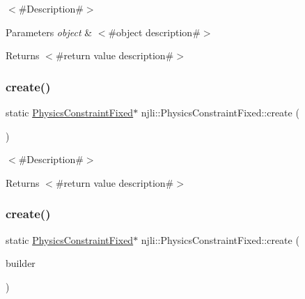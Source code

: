 $<$\#\+Description\#$>$


\begin{DoxyParams}{Parameters}
{\em object} & $<$\#object description\#$>$\\
\hline
\end{DoxyParams}
\begin{DoxyReturn}{Returns}
$<$\#return value description\#$>$ 
\end{DoxyReturn}
\mbox{\label{classnjli_1_1_physics_constraint_fixed_a871ec2fb30520315e5b94f903919bf6c}} 
\subsubsection{\texorpdfstring{create()}{create()}\hspace{0.1cm}{\footnotesize\ttfamily [1/2]}}
{\footnotesize\ttfamily static \mbox{\hyperlink{classnjli_1_1_physics_constraint_fixed}{Physics\+Constraint\+Fixed}}$\ast$ njli\+::\+Physics\+Constraint\+Fixed\+::create (\begin{DoxyParamCaption}{ }\end{DoxyParamCaption})\hspace{0.3cm}{\ttfamily [static]}}

$<$\#\+Description\#$>$

\begin{DoxyReturn}{Returns}
$<$\#return value description\#$>$ 
\end{DoxyReturn}
\mbox{\label{classnjli_1_1_physics_constraint_fixed_ac4aa0710e8762196ec38512ef92a464d}} 
\subsubsection{\texorpdfstring{create()}{create()}\hspace{0.1cm}{\footnotesize\ttfamily [2/2]}}
{\footnotesize\ttfamily static \mbox{\hyperlink{classnjli_1_1_physics_constraint_fixed}{Physics\+Constraint\+Fixed}}$\ast$ njli\+::\+Physics\+Constraint\+Fixed\+::create (\begin{DoxyParamCaption}\item[{const \mbox{\hyperlink{classnjli_1_1_physics_constraint_fixed_builder}{Physics\+Constraint\+Fixed\+Builder}} \&}]{builder }\end{DoxyParamCaption})\hspace{0.3cm}{\ttfamily [static]}}

